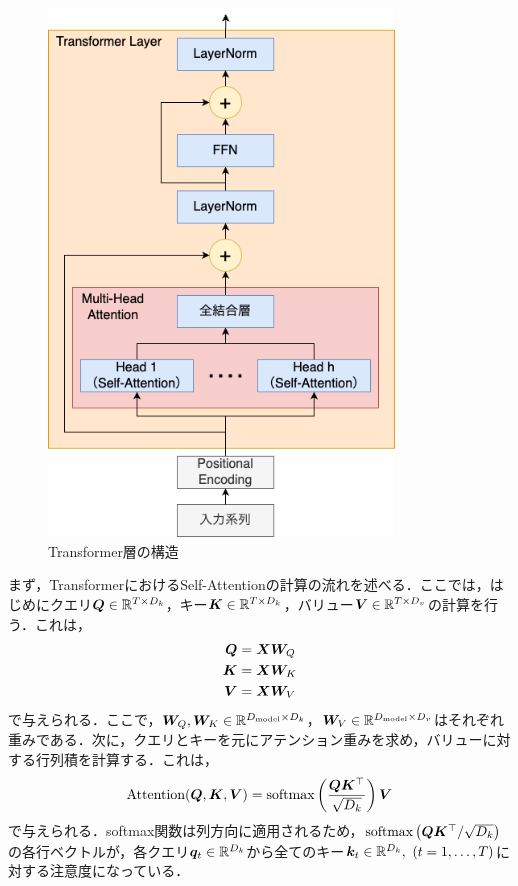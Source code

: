 \documentclass[12pt]{jarticle}
\numberwithin{equation}{section}    %
\numberwithin{figure}{section}      %
\numberwithin{table}{section}      %
\begin{document}
\begin{figure}[bt]
    \centering
    \includegraphics[height=140mm]{./figure/sec3/transformer.drawio.png}
    \caption{Transformer層の構造}
    \label{sec3:fig:transformer_layer}
\end{figure}

まず，TransformerにおけるSelf-Attentionの計算の流れを述べる．ここでは，はじめにクエリ$\bm{Q} \in \mathbb{R}^{T \times D_{k}}$，キー$\bm{K} \in \mathbb{R}^{T \times D_{k}}$，バリュー$\bm{V} \in \mathbb{R}^{T \times D_{v}}$の計算を行う．これは，
\begin{align}
    \bm{Q} & = \bm{X}\bm{W}_{Q} \\
    \bm{K} & = \bm{X}\bm{W}_{K} \\
    \bm{V} & = \bm{X}\bm{W}_{V}
\end{align}
で与えられる．ここで，$\bm{W}_{Q}, \bm{W}_{K} \in \mathbb{R}^{D_{\text{model}} \times D_{k}}$，$\bm{W}_{V} \in \mathbb{R}^{D_{\text{model}} \times D_{v}}$はそれぞれ重みである．次に，クエリとキーを元にアテンション重みを求め，バリューに対する行列積を計算する．これは，
\begin{equation}
    \text{Attention}(\bm{Q}, \bm{K}, \bm{V}) = \text{softmax}\left(\frac{\bm{Q}\bm{K}^\top}{\sqrt{D_{k}}}\right) \bm{V}
\end{equation}
で与えられる．softmax関数は列方向に適用されるため，$\text{softmax}\left(\bm{Q}\bm{K}^\top / \sqrt{D_{k}}\right)$の各行ベクトルが，各クエリ$\bm{q}_{t} \in \mathbb{R}^{D_{k}}$から全てのキー$\bm{k}_{t} \in \mathbb{R}^{D_{k}}, ~ (t = 1, \ldots, T)$に対する注意度になっている．
\end{document}
